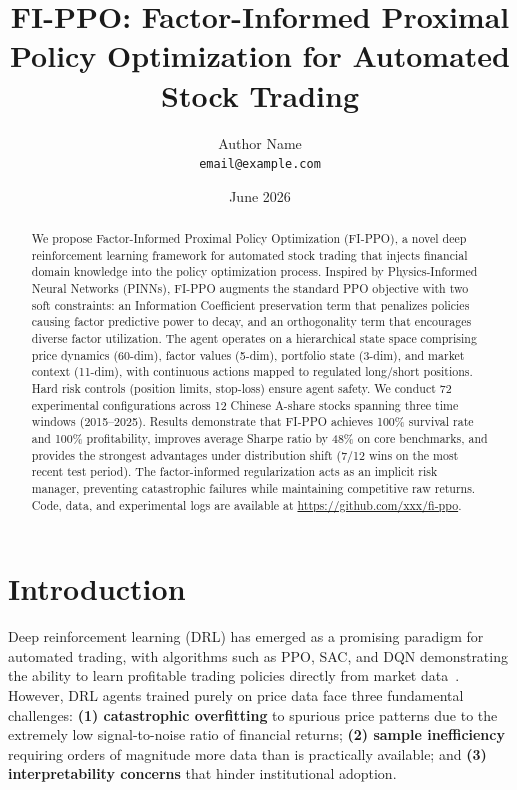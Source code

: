 \documentclass[11pt,a4paper]{article}
\title{\Large\textbf{FI-PPO: Factor-Informed Proximal Policy Optimization for Automated Stock Trading}}
\author{Author Name\\ \small\texttt{email@example.com}}
\date{June 2026}
\begin{document}
\maketitle

\begin{abstract}
We propose Factor-Informed Proximal Policy Optimization (FI-PPO), a novel deep reinforcement learning framework for automated stock trading that injects financial domain knowledge into the policy optimization process. Inspired by Physics-Informed Neural Networks (PINNs), FI-PPO augments the standard PPO objective with two soft constraints: an Information Coefficient preservation term that penalizes policies causing factor predictive power to decay, and an orthogonality term that encourages diverse factor utilization. The agent operates on a hierarchical state space comprising price dynamics (60-dim), factor values (5-dim), portfolio state (3-dim), and market context (11-dim), with continuous actions mapped to regulated long/short positions. Hard risk controls (position limits, stop-loss) ensure agent safety. We conduct 72 experimental configurations across 12 Chinese A-share stocks spanning three time windows (2015--2025). Results demonstrate that FI-PPO achieves 100\% survival rate and 100\% profitability, improves average Sharpe ratio by 48\% on core benchmarks, and provides the strongest advantages under distribution shift (7/12 wins on the most recent test period). The factor-informed regularization acts as an implicit risk manager, preventing catastrophic failures while maintaining competitive raw returns. Code, data, and experimental logs are available at \url{https://github.com/xxx/fi-ppo}.
\end{abstract}

\section{Introduction}
\label{sec:intro}

Deep reinforcement learning (DRL) has emerged as a promising paradigm for automated trading, with algorithms such as PPO, SAC, and DQN demonstrating the ability to learn profitable trading policies directly from market data~\cite{finrl2024,fmarl2025}. However, DRL agents trained purely on price data face three fundamental challenges: \textbf{(1) catastrophic overfitting} to spurious price patterns due to the extremely low signal-to-noise ratio of financial returns; \textbf{(2) sample inefficiency} requiring orders of magnitude more data than is practically available; and \textbf{(3) interpretability concerns} that hinder institutional adoption.
\end{document}
